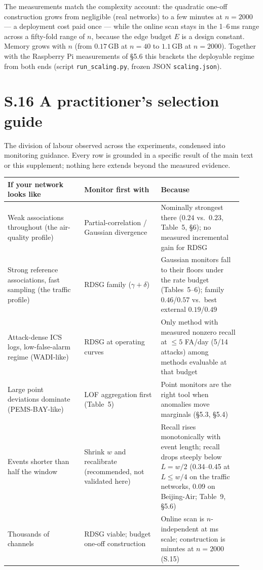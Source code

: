 \documentclass[11pt,a4paper]{article}
\begin{document}
The measurements match the complexity account: the quadratic one-off
construction grows from negligible (real networks) to a few minutes at
$n{=}2000$ --- a deployment cost paid once --- while the online scan
stays in the 1--6\,ms range across a fifty-fold range of $n$, because
the edge budget $E$ is a design constant. Memory grows with $n$
(from $0.17$\,GB at $n{=}40$ to $1.1$\,GB at $n{=}2000$). Together
with the Raspberry Pi measurements of \S5.6 this brackets the deployable
regime from both ends (script \texttt{run\_scaling.py}, frozen JSON
\texttt{scaling.json}).

\clearpage
\section*{S.16 A practitioner's selection guide}

The division of labour observed across the experiments, condensed into
monitoring guidance. Every row is grounded in a specific result of the
main text or this supplement; nothing here extends beyond the measured
evidence.

\medskip
\noindent\begin{tabular}{@{}p{0.30\linewidth}p{0.30\linewidth}p{0.32\linewidth}@{}}
\toprule
If your network looks like & Monitor first with & Because \\
\midrule
Weak associations throughout (the air-quality
profile) & Partial-correlation / Gaussian divergence & Nominally
strongest there ($0.24$ vs.\ $0.23$, Table~5, \S6); no measured
incremental gain for RDSG \\
Strong reference associations, fast sampling (the traffic profile) &
RDSG family ($\gamma{+}\delta$) & Gaussian monitors fall to their floors
under the rate budget (Tables~5--6); family $0.46$/$0.57$ vs.\ best
external $0.19$/$0.49$ \\
Attack-dense ICS logs, low-false-alarm regime (WADI-like) & RDSG at
operating curves & Only method with measured nonzero recall at
$\le 5$ FA/day (5/14 attacks) among methods evaluable at that budget \\
Large point deviations dominate (PEMS-BAY-like) & LOF aggregation first
(Table~5) & Point monitors are the right tool when anomalies move marginals
(\S5.3, \S5.4) \\
Events shorter than half the window & Shrink $w$ and recalibrate
(recommended, not validated here) & Recall rises monotonically with
event length; recall drops steeply below $L = w/2$ (0.34--0.45 at
$L \le w/4$ on the traffic networks, 0.09 on Beijing-Air; Table~9,
\S5.6) \\
Thousands of channels & RDSG viable; budget one-off construction &
Online scan is $n$-independent at ms scale; construction is minutes at
$n{=}2000$ (S.15) \\
\bottomrule
\end{tabular}
\end{document}
